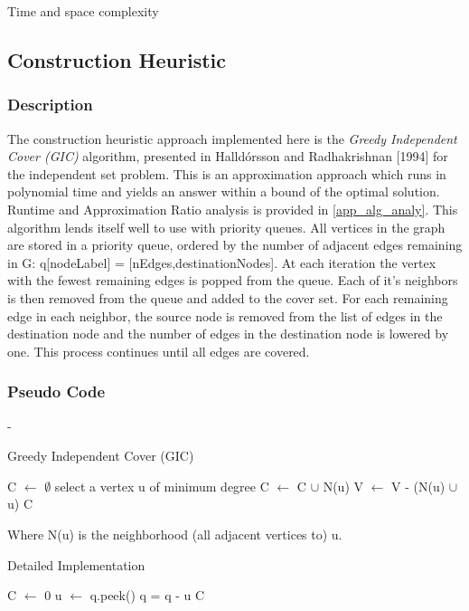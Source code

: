 \documentclass[acmlarge]{acmart}
\begin{document}
Time and space complexity\\

\subsection{Construction Heuristic}

\subsubsection{Description}

The construction heuristic approach implemented here is the \textit{Greedy Independent Cover (GIC)} algorithm, presented in Halld\'{o}rsson and Radhakrishnan [1994] \cite{Hall97} for the independent set problem. This is an approximation approach which runs in polynomial time and yields an answer within a bound of the optimal solution. Runtime and Approximation Ratio analysis is provided in \ref{app_alg_analy}. This algorithm lends itself well to use with priority queues. All vertices in the graph are stored in a priority queue, ordered by the number of adjacent edges remaining in G: q[nodeLabel] = [nEdges,destinationNodes]. At each iteration the vertex with the fewest remaining edges is popped from the queue. Each of it's neighbors is then removed from the queue and added to the cover set. For each remaining edge in each neighbor, the source node is removed from the list of edges in the destination node and the number of edges in the destination node is lowered by one. This process continues until all edges are covered.

\subsubsection{Pseudo Code}

-\\

\begin{algorithm}[H]
	\caption{Greedy Independent Cover (GIC)}
	\SetAlgoLined
	C $\leftarrow$ $\emptyset$\;
	{
		select a vertex u of minimum degree\;
		C $\leftarrow$ C $\cup$ N(u)\;
		V $\leftarrow$ V - (N(u) $\cup$ {u})\;
	}
	\Return C\;
\end{algorithm}

Where N(u) is the neighborhood (all adjacent vertices to) u.\\

\begin{algorithm}[H]
	\caption{Detailed Implementation}
	\SetAlgoLined
	C $\leftarrow$ 0\;
	{
		u $\leftarrow$ q.peek()\;
		q = q - u\;
	}
	\Return C\;
\end{algorithm}
\end{document}
